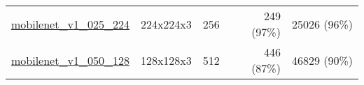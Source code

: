 \begin{tabular}{lrrrr}
\href{https://tfhub.dev/google/imagenet/mobilenet\_v1\_025\_224/feature\_vector/1}{mobilenet\_v1\_025\_224} \cite{howard2017mobilenets} &      224x224x3 &             256 &            249 (97\%) &    25026 (96\%)                       \\
\href{https://tfhub.dev/google/imagenet/mobilenet\_v1\_050\_128/feature\_vector/1}{mobilenet\_v1\_050\_128} \cite{howard2017mobilenets} &      128x128x3 &             512 &            446 (87\%) &    46829 (90\%)                       \\
\bottomrule
\end{tabular}
